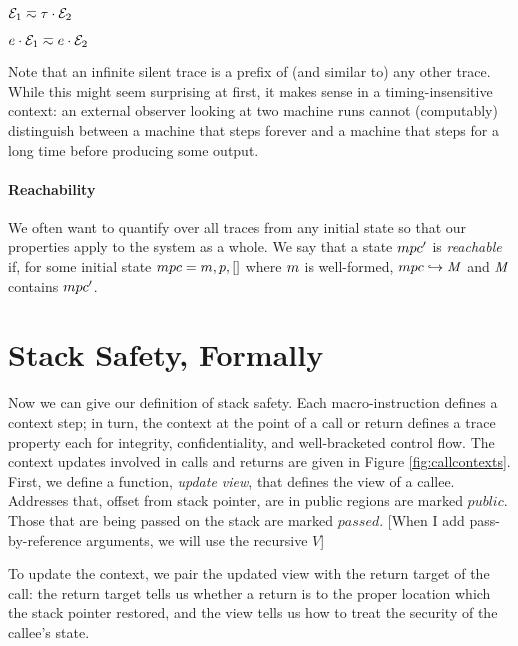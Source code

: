 \documentclass[10pt,conference]{ieeetran}%
\theoremstyle{definition}
\begin{document}
\begin{minipage}{.4\columnwidth}
           {\(\mathcal{E}_1 \eqsim \tau \cdot \mathcal{E}_2\)}
\end{minipage}
\begin{minipage}{.4\columnwidth}
           {\(e \cdot \mathcal{E}_1 \eqsim e \cdot \mathcal{E}_2\)}
\end{minipage}

Note that an infinite silent trace is a
prefix of (and similar to) any other trace. While this might seem
surprising at first, it makes sense in a timing-insensitive context:
an external observer looking at two machine runs cannot (computably)
distinguish between a machine that steps forever and a machine that
steps for a long time before producing some output.

\paragraph*{Reachability}

We often want to quantify over all traces from any initial state so that our
properties apply to the system as a whole. We say that a state \(mpc'\)
is {\em reachable} if, for some initial state \(mpc = m,p,[]\)
where \(m\) is well-formed, \(mpc \hookrightarrow \mathit{M}\)
and \(\mathit{M}\) contains \(mpc'\).

\section{Stack Safety, Formally}
\label{sec:properties}

Now we can give our definition of stack safety. Each macro-instruction defines a
context step; in turn, the context at the point of a call or return defines a trace
property each for integrity, confidentiality, and well-bracketed control flow.
The context updates involved in calls and returns are given in Figure \ref{fig:callcontexts}.
First, we define a function, {\it update view}, that defines the view of a callee.
Addresses that, offset from stack pointer, are in public regions are marked
\(\mathit{public}\). Those that are being passed on the stack are marked
\(\mathit{passed}\). [When I add pass-by-reference arguments, we will use
the recursive \(V\)]

To update the context, we pair the updated view with the return target of the
call: the return target tells us whether a return is to the proper location
which the stack pointer restored, and the view tells us how to treat the
security of the callee's state.
\end{document}
